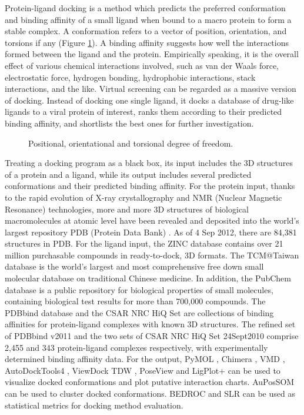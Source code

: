 Protein-ligand docking is a method which predicts the preferred conformation and binding affinity of a small ligand when bound to a macro protein to form a stable complex. A conformation refers to a vector of position, orientation, and torsions if any (Figure \ref{background:DegreeOfFreedom}). A binding affinity suggests how well the interactions formed between the ligand and the protein. Empirically speaking, it is the overall effect of various chemical interactions involved, such as van der Waals force, electrostatic force, hydrogen bonding, hydrophobic interactions, stack interactions, and the like. Virtual screening can be regarded as a massive version of docking. Instead of docking one single ligand, it docks a database of drug-like ligands to a viral protein of interest, ranks them according to their predicted binding affinity, and shortlists the best ones for further investigation.

\begin{figure}
\centering
{}
\caption{Positional, orientational and torsional degree of freedom.}
\label{background:DegreeOfFreedom}
\end{figure}

Treating a docking program as a black box, its input includes the 3D structures of a protein and a ligand, while its output includes several predicted conformations and their predicted binding affinity. For the protein input, thanks to the rapid evolution of X-ray crystallography and NMR (Nuclear Magnetic Resonance) technologies, more and more 3D structures of biological macromolecules at atomic level have been revealed and deposited into the world's largest repository PDB (Protein Data Bank) \citep{540,537}. As of 4 Sep 2012, there are 84,381 structures in PDB. For the ligand input, the ZINC database \citep{532,1178} contains over 21 million purchasable compounds in ready-to-dock, 3D formats. The TCM@Taiwan database \citep{528} is the world's largest and most comprehensive free down small molecular database on traditional Chinese medicine. In addition, the PubChem database \citep{526} is a public repository for biological properties of small molecules, containing biological test results for more than 700,000 compounds. The PDBbind database \citep{529,530} and the CSAR NRC HiQ Set \citep{857,960} are collections of binding affinities for protein-ligand complexes with known 3D structures. The refined set of PDBbind v2011 and the two sets of CSAR NRC HiQ Set 24Sept2010 comprise 2,455 and 343 protein-ligand complexes respectively, with experimentally determined binding affinity data. For the output, PyMOL \citep{1221}, Chimera \citep{1219}, VMD \citep{1220}, AutoDockTools4 \citep{596}, ViewDock TDW \citep{559}, PoseView \citep{748} and LigPlot+ \citep{951} can be used to visualize docked conformations and plot putative interaction charts. AuPosSOM \citep{598} can be used to cluster docked conformations. BEDROC \citep{490} and SLR \citep{489} can be used as statistical metrics for docking method evaluation.

